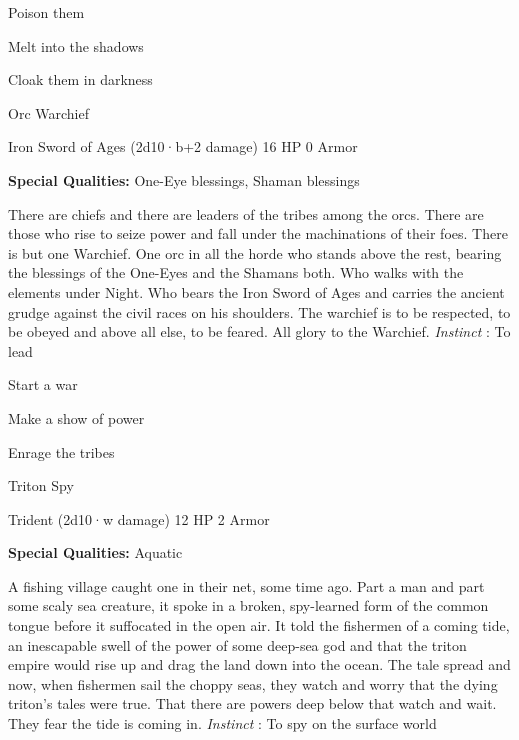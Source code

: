 \item Poison them

         
\item Melt into the shadows

         
\item Cloak them in darkness

       
\stopitemize
       
\startMonsterName
Orc Warchief	 
\stopMonsterName
       

Iron Sword of Ages (2d10·b+2 damage)	16 HP	0 Armor

       


       
\startMonsterQualities
         {\bf Special Qualities:}  One-Eye blessings, Shaman blessings
\stopMonsterQualities
       
\startMonsterDescription
There are chiefs and there are leaders of the tribes among the orcs. There are those who rise to seize power and fall under the machinations of their foes. There is but one Warchief. One orc in all the horde who stands above the rest, bearing the blessings of the One-Eyes and the Shamans both. Who walks with the elements under Night. Who bears the Iron Sword of Ages and carries the ancient grudge against the civil races on his shoulders. The warchief is to be respected, to be obeyed and above all else, to be feared. All glory to the Warchief. {\em Instinct} : To lead
\stopMonsterDescription
       
\startitemize[1,packed]
         
\item Start a war

         
\item Make a show of power

         
\item Enrage the tribes

       
\stopitemize
       
\startMonsterName
Triton Spy	 
\stopMonsterName
       

Trident (2d10·w damage)	12 HP	2 Armor

       


       
\startMonsterQualities
         {\bf Special Qualities:}  Aquatic
\stopMonsterQualities
       
\startMonsterDescription
A fishing village caught one in their net, some time ago. Part a man and part some scaly sea creature, it spoke in a broken, spy-learned form of the common tongue before it suffocated in the open air. It told the fishermen of a coming tide, an inescapable swell of the power of some deep-sea god and that the triton empire would rise up and drag the land down into the ocean. The tale spread and now, when fishermen sail the choppy seas, they watch and worry that the dying triton’s tales were true. That there are powers deep below that watch and wait. They fear the tide is coming in. {\em Instinct} : To spy on the surface world
\stopMonsterDescription
       
